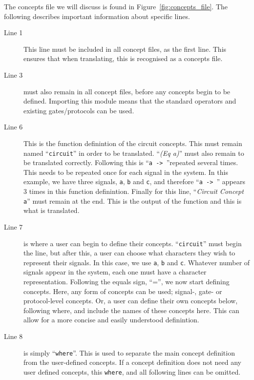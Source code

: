 \documentclass{proc}
\begin{document}
The concepts file we will discuss is found in Figure~\ref{fig:concepts_file}. The following describes important information about specific lines.

\begin{description}
  \item [Line 1] This line must be included in all concept files, as the first line. This ensures that when translating, this is recognised as a concepts file.
  
  \item [Line 3] must also remain in all concept files, before any concepts begin to be defined. Importing this module means that the standard operators and existing gates/protocols can be 
  used. 
  
  \item [Line 6] This is the function definintion of the circuit concepts. This must remain named ``\texttt{circuit}'' in order to be translated. ``\emph{(Eq a)}'' must also remain to be translated 
  correctly. Following this is ``\texttt{a -> }''repeated several times. This needs to be repeated once for each signal in the system. In this example, we have three signals, \texttt{a}, 
  \texttt{b} and \texttt{c}, and therefore ``\texttt{a -> }'' appears 3 times in this function definintion. Finally for this line, ``\emph{Circuit Concept} \texttt{a}'' must remain at the end. This 
  is the output of the function and this is what is translated.
  
  \item [Line 7] is where a user can begin to define their concepts. ``\texttt{circuit}'' must begin the line, but after this, a user can choose what characters they wish to represent their 
  signals. In this case, we use \texttt{a}, \texttt{b} and \texttt{c}. Whatever number of signals appear in the system, each one must have a character representation. Following the equals 
  sign, ``='', we now start defining concepts. Here, any form of concepts can be used; signal-, gate- or protocol-level concepts. Or, a user can define their own concepts below, following 
  where, and include the names of these concepts here. This can allow for a more concise and easily understood definintion.
  
  \item [Line 8] is simply ``\texttt{where}''. This is used to separate the main concept definition from the user-defined concepts. If a concept definition does not need any user defined 
  concepts, this \texttt{where}, and all following lines can be omitted.

\end{description}
\end{document}
